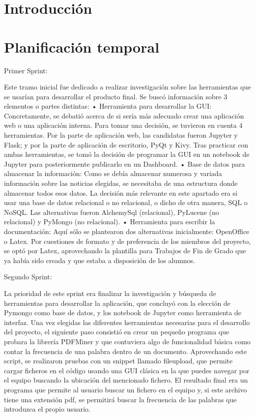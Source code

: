 
\section{Introducción}

\section{Planificación temporal}
Primer Sprint:

Este tramo inicial fue dedicado a realizar investigación sobre las herramientas que se usarían para desarrollar el producto final. Se buscó información sobre 3 elementos o partes distintas:
•	Herramienta para desarrollar la GUI: Concretamente, se debatió acerca de si sería más adecuado crear una aplicación web o una aplicación interna. Para tomar una decisión, se tuvieron en cuenta 4 herramientas. Por la parte de aplicación web, las candidatas fueron Jupyter y Flask; y por la parte de aplicación de escritorio, PyQt y Kivy. Tras practicar con ambas herramientas, se tomó la decisión de programar la GUI en un notebook de Jupyter para posteriormente publicarlo en un Dashboard.
•	Base de datos para almacenar la información: Como se debía almacenar numerosa y variada información sobre las noticias elegidas, se necesitaba de una estructura donde almacenar todos esos datos. La decisión más relevante en este apartado era si usar una base de datos relacional o no relacional, o dicho de otra manera, SQL o NoSQL. Las alternativas fueron AlchemySql (relacional), PyLucene (no relacional) y PyMongo (no relacional).
•	Herramienta para escribir la documentación: Aquí sólo se plantearon dos alternativas inicialmente: OpenOffice o Latex. Por cuestiones de formato y de preferencia de los miembros del proyecto, se optó por Latex, aprovechando la plantilla para Trabajos de Fin de Grado que ya había sido creada y que estaba a disposición de los alumnos.

Segundo Sprint:

La prioridad de este sprint era finalizar la investigación y búsqueda de herramientas para desarrollar la aplicación, que concluyó con la elección de Pymongo como base de datos, y los notebook de Jupyter como herramienta de interfaz.
Una vez elegidas las diferentes herramientas necesarias para el desarrollo del proyecto, el siguiente paso consistió en crear un pequeño programa que probara la librería PDFMiner y que contuviera algo de funcionalidad básica como contar la frecuencia de una palabra dentro de un documento.
Aprovechando este script, se realizaron pruebas con un snippet llamado fileupload, que permite cargar ficheros en el código usando una GUI clásica en la que puedes navegar por el equipo buscando la ubicación del mencionado fichero. El resultado final era un programa que  permite al usuario buscar un fichero en el equipo y, si este archivo tiene una extensión pdf, se permitirá buscar la frecuencia de las palabras que introduzca el propio usuario.

